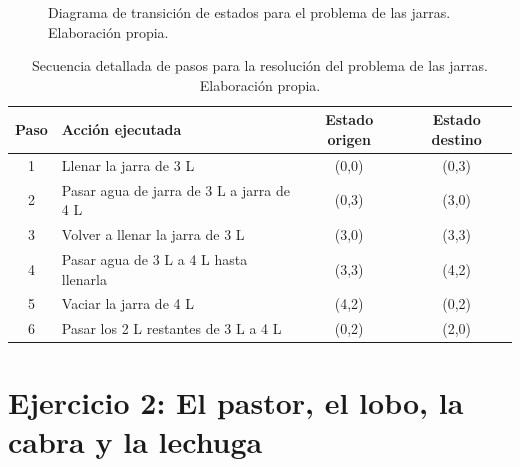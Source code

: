 \documentclass[11pt,letterpaper]{article}
\begin{document}
\begin{figure}[ht]
\centering
{}
\caption{Diagrama de transición de estados para el problema de las jarras. Elaboración propia.}
\label{fig:jarras}
\end{figure}

\begin{table}[ht]
\centering\small
\renewcommand{\arraystretch}{1.15}
\begin{tabular}{@{}clcc@{}}
\toprule
\textbf{Paso} & \textbf{Acción ejecutada} & \textbf{Estado origen} & \textbf{Estado destino} \\
\midrule
1 & Llenar la jarra de 3 L & (0,0) & (0,3) \\
2 & Pasar agua de jarra de 3 L a jarra de 4 L & (0,3) & (3,0) \\
3 & Volver a llenar la jarra de 3 L & (3,0) & (3,3) \\
4 & Pasar agua de 3 L a 4 L hasta llenarla & (3,3) & (4,2) \\
5 & Vaciar la jarra de 4 L & (4,2) & (0,2) \\
6 & Pasar los 2 L restantes de 3 L a 4 L & (0,2) & (2,0) \\
\bottomrule
\end{tabular}
\caption{Secuencia detallada de pasos para la resolución del problema de las jarras. Elaboración propia.}
\label{tab:jarras}
\end{table}

\section{Ejercicio 2: El pastor, el lobo, la cabra y la lechuga}
\end{document}
